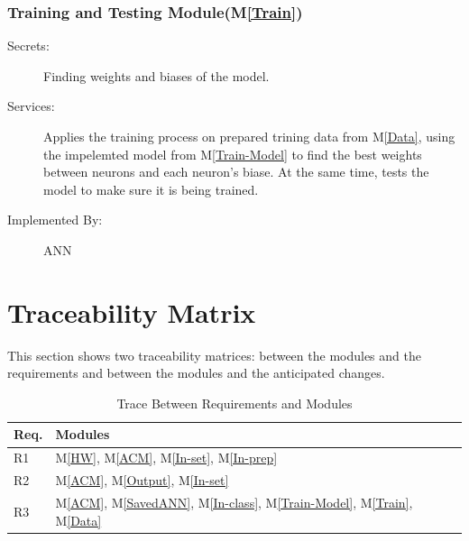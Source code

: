 \documentclass[12pt, titlepage]{article}
\newcommand{\mref}[1]{M\ref{#1}}
\begin{document}
\subsubsection{Training and Testing Module(\mref{Train})}

\begin{description}
  \item[Secrets:]Finding weights and biases of the model.
  \item[Services:]Applies the training process on prepared trining data from \mref{Data}, using the impelemted model 
  from \mref{Train-Model} to find the best weights between neurons and each neuron's biase. At the same 
  time, tests the model to make sure it is being trained.
  \item[Implemented By:] ANN
\end{description}




\section{Traceability Matrix} \label{SecTM}

This section shows two traceability matrices: between the modules and the
requirements and between the modules and the anticipated changes.

\begin{table}[H]
\centering
\begin{tabular}{p{} p{}}
\toprule
\textbf{Req.} & \textbf{Modules}\\
\midrule
R1 & \mref{HW}, \mref{ACM}, \mref{In-set}, \mref{In-prep}\\
R2 & \mref{ACM}, \mref{Output}, \mref{In-set}\\
R3 & \mref{ACM}, \mref{SavedANN}, \mref{In-class}, \mref{Train-Model},
 \mref{Train}, \mref{Data}\\
\bottomrule
\end{tabular}
\caption{Trace Between Requirements and Modules}
\label{TblRT}
\end{table}
\end{document}
